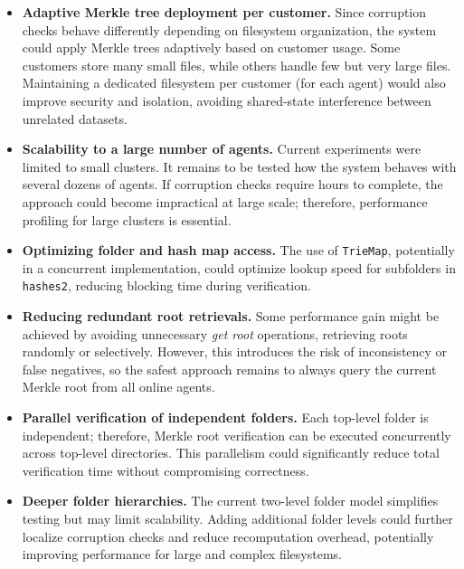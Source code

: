 \begin{itemize}
	\item \textbf{Adaptive Merkle tree deployment per customer.}
	      Since corruption checks behave differently depending on filesystem organization, the system could apply Merkle trees adaptively based on customer usage.
	      Some customers store many small files, while others handle few but very large files.
	      Maintaining a dedicated filesystem per customer (for each agent) would also improve security and isolation, avoiding shared-state interference between unrelated datasets.

	\item \textbf{Scalability to a large number of agents.}
	      Current experiments were limited to small clusters.
	      It remains to be tested how the system behaves with several dozens of agents.
	      If corruption checks require hours to complete, the approach could become impractical at large scale; therefore, performance profiling for large clusters is essential.

	\item \textbf{Optimizing folder and hash map access.}
	      The use of \texttt{TrieMap}, potentially in a concurrent implementation,
	      could optimize lookup speed for subfolders in \texttt{hashes2}, reducing blocking time during verification.

	\item \textbf{Reducing redundant root retrievals.}
	      Some performance gain might be achieved by avoiding unnecessary \emph{get root} operations, retrieving roots randomly or selectively.
	      However, this introduces the risk of inconsistency or false negatives, so the safest approach remains to always query the current Merkle root from all online agents.

	\item \textbf{Parallel verification of independent folders.}
	      Each top-level folder is independent; therefore, Merkle root verification can be executed concurrently across top-level directories.
	      This parallelism could significantly reduce total verification time without compromising correctness.

	\item \textbf{Deeper folder hierarchies.}
	      The current two-level folder model simplifies testing but may limit scalability.
	      Adding additional folder levels could further localize corruption checks and reduce recomputation overhead, potentially improving performance for large and complex filesystems.


\end{itemize}
